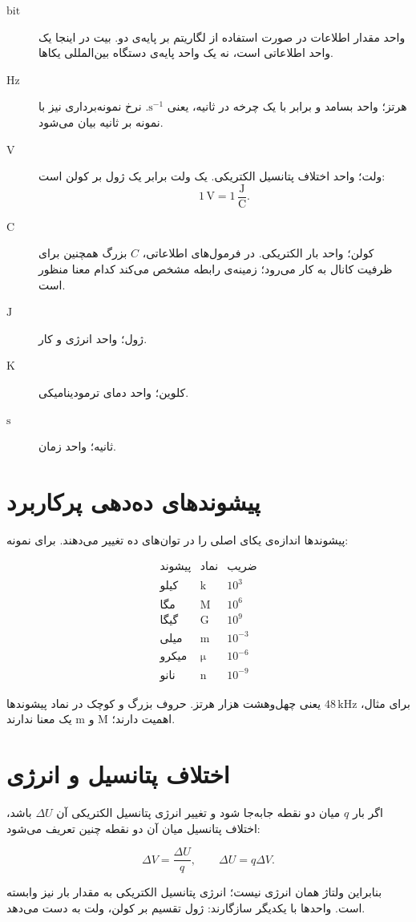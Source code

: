 \begin{description}
  \item[\(\mathrm{bit}\)] واحد مقدار اطلاعات در صورت استفاده از لگاریتم بر پایه‌ی دو. بیت در اینجا یک واحد اطلاعاتی است، نه یک واحد پایه‌ی دستگاه بین‌المللی یکاها.
  \item[\(\mathrm{Hz}\)] هرتز؛ واحد بسامد و برابر با یک چرخه در ثانیه، یعنی \(\mathrm{s}^{-1}\). نرخ نمونه‌برداری نیز با نمونه بر ثانیه بیان می‌شود.
  \item[\(\mathrm{V}\)] ولت؛ واحد اختلاف پتانسیل الکتریکی. یک ولت برابر یک ژول بر کولن است:
  \[
  1\,\mathrm{V}=1\,\frac{\mathrm{J}}{\mathrm{C}}.
  \]
  \item[\(\mathrm{C}\)] کولن؛ واحد بار الکتریکی. در فرمول‌های اطلاعاتی، \(C\) بزرگ همچنین برای ظرفیت کانال به کار می‌رود؛ زمینه‌ی رابطه مشخص می‌کند کدام معنا منظور است.
  \item[\(\mathrm{J}\)] ژول؛ واحد انرژی و کار.
  \item[\(\mathrm{K}\)] کلوین؛ واحد دمای ترمودینامیکی.
  \item[\(\mathrm{s}\)] ثانیه؛ واحد زمان.
\end{description}

\section{پیشوندهای ده‌دهی پرکاربرد}

پیشوندها اندازه‌ی یکای اصلی را در توان‌های ده تغییر می‌دهند. برای نمونه:

\[
\begin{array}{c|c|c}
\text{پیشوند} & \text{نماد} & \text{ضریب}\\
\hline
\text{کیلو} & \mathrm{k} & 10^3\\
\text{مگا} & \mathrm{M} & 10^6\\
\text{گیگا} & \mathrm{G} & 10^9\\
\text{میلی} & \mathrm{m} & 10^{-3}\\
\text{میکرو} & \mathrm{\mu} & 10^{-6}\\
\text{نانو} & \mathrm{n} & 10^{-9}
\end{array}
\]

برای مثال، \(48\,\mathrm{kHz}\) یعنی چهل‌وهشت هزار هرتز. حروف بزرگ و کوچک در نماد پیشوندها اهمیت دارند؛ \(\mathrm{M}\) و \(\mathrm{m}\) یک معنا ندارند.

\section{اختلاف پتانسیل و انرژی}

اگر بار \(q\) میان دو نقطه جابه‌جا شود و تغییر انرژی پتانسیل الکتریکی آن \(\Delta U\) باشد، اختلاف پتانسیل میان آن دو نقطه چنین تعریف می‌شود:

\[
\Delta V=\frac{\Delta U}{q},
\qquad
\Delta U=q\Delta V.
\]

بنابراین ولتاژ همان انرژی نیست؛ انرژی پتانسیل الکتریکی به مقدار بار نیز وابسته است. واحدها با یکدیگر سازگارند: ژول تقسیم بر کولن، ولت به دست می‌دهد.
